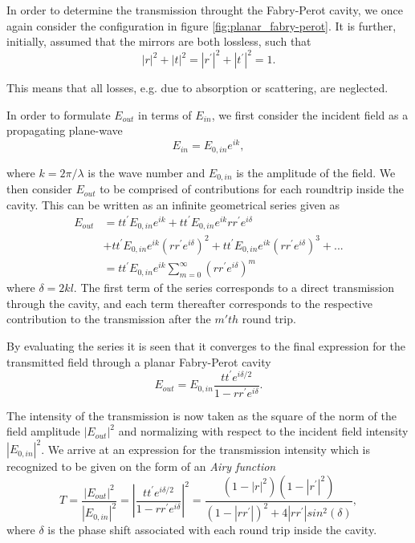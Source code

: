 In order to determine the transmission throught the Fabry-Perot cavity, we once again consider the configuration in figure \ref{fig:planar_fabry-perot}. It is further, initially, assumed that the mirrors are both lossless, such that
\begin{equation}
    |r|^2 + |t|^2 = |r^{\prime}|^2 + |t^{\prime}|^2 = 1.
    \label{eq:lossless_condition}
\end{equation}

This means that all losses, e.g. due to absorption or scattering, are neglected. 

In order to formulate $E_{out}$ in terms of $E_{in}$, we first consider the incident field as a propagating plane-wave
\begin{equation}
    E_{in} = E_{0,in} e^{ik},
\end{equation}

where $k = 2 \pi / \lambda$ is the wave number and $E_{0,in}$ is the amplitude of the field. We then consider $E_{out}$ to be comprised of contributions for each roundtrip inside the cavity. This can be written as an infinite geometrical series given as
\begin{equation}
    \begin{split}
        E_{out} & = tt^{\prime} E_{0,in} e^{ik} + tt^{\prime} E_{0,in} e^{ik} rr^{\prime} e^{i\delta}\\&+ tt^{\prime} E_{0,in} e^{ik} \left(rr^{\prime} e^{i\delta}\right)^2 + tt^{\prime} E_{0,in} e^{ik} \left(rr^{\prime} e^{i\delta}\right)^3 + ...\\& = tt^{\prime} E_{0,in} e^{ik} \sum^{\infty}_{m=0}\left( rr^{\prime}e^{i\delta} \right)^m
    \end{split}
    \label{eq:transmission_as_geometric_series}
\end{equation}
where $\delta = 2kl$. The first term of the series corresponds to a direct transmission through the cavity, and each term thereafter corresponds to the respective contribution to the transmission after the $m'th$ round trip. 

By evaluating the series it is seen that it converges to the final expression for the transmitted field through a planar Fabry-Perot cavity
\begin{equation}
    E_{out} = E_{0,in}\frac{tt^{\prime} e^{i\delta /2}}{1 - rr^{\prime} e^{i\delta}}.
    \label{eq:fabry_perot_trans}
\end{equation}

The intensity of the transmission is now taken as the square of the norm of the field amplitude $|E_{out}|^2$ and normalizing with respect to the incident field intensity $|E_{0,in}|^2$. We arrive at an expression for the transmission intensity which is recognized to be given on the form of an \emph{Airy function}\cite{Pedrotti}
\begin{equation}
    T = \frac{|E_{out}|^2}{|E_{0,in}|^2} = \left|\frac{tt^{\prime}e^{i\delta/2}}{1 - rr^{\prime}e^{i \delta}}\right|^2 = \frac{(1-|r|^2)(1-|r^{\prime}|^2)}{(1-|rr^{\prime}|)^2 + 4|rr^{\prime}|sin^2(\delta)},
    \label{eq:airy_function}
\end{equation}
where $\delta$ is the phase shift associated with each round trip inside the cavity.


